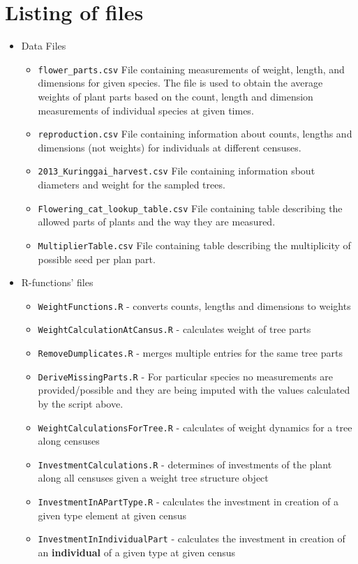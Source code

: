 \documentclass[10pt]{book} %
\begin{document}
\section{Listing of files}
\begin{itemize}
\item Data Files
\begin{itemize}
\item \texttt{flower\_parts.csv} File containing measurements of weight, length, and dimensions for given species. The file is used to obtain the average weights of plant parts based on the count, length and dimension measurements of individual species at given times.
\item \texttt{reproduction.csv} File containing information about counts, lengths and dimensions (not weights) for individuals at different censuses.
\item \texttt{2013\_Kuringgai\_harvest.csv} File containing information sbout diameters and weight for the sampled trees.
\item \texttt{Flowering\_cat\_lookup\_table.csv} File containing table describing the allowed parts of plants and the way they are measured.
\item \texttt{MultiplierTable.csv} File containing table describing the multiplicity of possible seed per plan part.
\end{itemize}
\item{R-functions' files}
\begin{itemize}
\item \texttt{WeightFunctions.R} - converts counts, lengths and dimensions to weights
\item \texttt{WeightCalculationAtCansus.R} - calculates weight of tree parts
\item \texttt{RemoveDumplicates.R} - merges multiple entries for the same tree parts
\item \texttt{DeriveMissingParts.R} - For particular species no measurements are provided/possible and they are being imputed with the values calculated by the script above.
\item \texttt{WeightCalculationsForTree.R} - calculates of weight dynamics for a tree along censuses
\item \texttt{InvestmentCalculations.R} - determines of investments of the plant along all censuses given a weight tree structure object
\item \texttt{InvestmentInAPartType.R} - calculates the investment in creation of a given type element at given census
\item \texttt{InvestmentInIndividualPart} - calculates the investment in creation of an \textbf{individual} of a given type at given census

\end{itemize}
\end{itemize}
\end{document}
